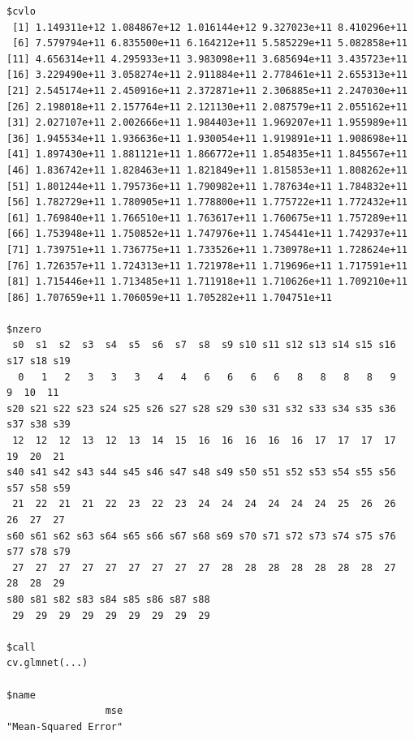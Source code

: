 \documentclass[
]{article}
\begin{document}
\begin{verbatim}
$cvlo
 [1] 1.149311e+12 1.084867e+12 1.016144e+12 9.327023e+11 8.410296e+11
 [6] 7.579794e+11 6.835500e+11 6.164212e+11 5.585229e+11 5.082858e+11
[11] 4.656314e+11 4.295933e+11 3.983098e+11 3.685694e+11 3.435723e+11
[16] 3.229490e+11 3.058274e+11 2.911884e+11 2.778461e+11 2.655313e+11
[21] 2.545174e+11 2.450916e+11 2.372871e+11 2.306885e+11 2.247030e+11
[26] 2.198018e+11 2.157764e+11 2.121130e+11 2.087579e+11 2.055162e+11
[31] 2.027107e+11 2.002666e+11 1.984403e+11 1.969207e+11 1.955989e+11
[36] 1.945534e+11 1.936636e+11 1.930054e+11 1.919891e+11 1.908698e+11
[41] 1.897430e+11 1.881121e+11 1.866772e+11 1.854835e+11 1.845567e+11
[46] 1.836742e+11 1.828463e+11 1.821849e+11 1.815853e+11 1.808262e+11
[51] 1.801244e+11 1.795736e+11 1.790982e+11 1.787634e+11 1.784832e+11
[56] 1.782729e+11 1.780905e+11 1.778800e+11 1.775722e+11 1.772432e+11
[61] 1.769840e+11 1.766510e+11 1.763617e+11 1.760675e+11 1.757289e+11
[66] 1.753948e+11 1.750852e+11 1.747976e+11 1.745441e+11 1.742937e+11
[71] 1.739751e+11 1.736775e+11 1.733526e+11 1.730978e+11 1.728624e+11
[76] 1.726357e+11 1.724313e+11 1.721978e+11 1.719696e+11 1.717591e+11
[81] 1.715446e+11 1.713485e+11 1.711918e+11 1.710626e+11 1.709210e+11
[86] 1.707659e+11 1.706059e+11 1.705282e+11 1.704751e+11

$nzero
 s0  s1  s2  s3  s4  s5  s6  s7  s8  s9 s10 s11 s12 s13 s14 s15 s16 s17 s18 s19 
  0   1   2   3   3   3   4   4   6   6   6   6   8   8   8   8   9   9  10  11 
s20 s21 s22 s23 s24 s25 s26 s27 s28 s29 s30 s31 s32 s33 s34 s35 s36 s37 s38 s39 
 12  12  12  13  12  13  14  15  16  16  16  16  16  17  17  17  17  19  20  21 
s40 s41 s42 s43 s44 s45 s46 s47 s48 s49 s50 s51 s52 s53 s54 s55 s56 s57 s58 s59 
 21  22  21  21  22  23  22  23  24  24  24  24  24  24  25  26  26  26  27  27 
s60 s61 s62 s63 s64 s65 s66 s67 s68 s69 s70 s71 s72 s73 s74 s75 s76 s77 s78 s79 
 27  27  27  27  27  27  27  27  27  28  28  28  28  28  28  28  27  28  28  29 
s80 s81 s82 s83 s84 s85 s86 s87 s88 
 29  29  29  29  29  29  29  29  29 

$call
cv.glmnet(...)

$name
                 mse 
"Mean-Squared Error" 


\end{verbatim}
\end{document}
